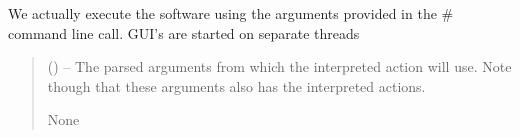 \documentclass[letterpaper,11pt,english]{sphinxmanual}
\begin{document}
\begin{savenotes}\begin{fulllineitems}
\label{\detokenize{code/opihiexarata.__main__:opihiexarata.__main__.__main_execute_arguments}}
\pysigstartsignatures
{}
\pysigstopsignatures
\sphinxAtStartPar
We actually execute the software using the arguments provided in the
\# command line call. GUI’s are started on separate threads
\begin{quote}\begin{description}
\sphinxAtStartPar
{} () – The parsed arguments from which the interpreted action will use. Note
though that these arguments also has the interpreted actions.

\sphinxAtStartPar
None

\end{description}\end{quote}

\end{fulllineitems}\end{savenotes}

\end{document}
